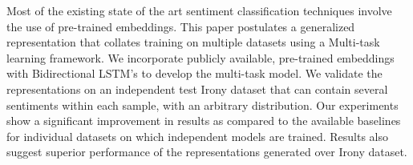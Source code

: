Most of the existing state of the art sentiment classification techniques involve the use of pre-trained embeddings. This paper postulates a generalized representation that collates training on multiple datasets using a Multi-task learning framework. We incorporate publicly available, pre-trained embeddings with Bidirectional LSTM's to develop the multi-task model. We validate the representations on an independent test Irony dataset that can contain several sentiments within each sample, with an arbitrary distribution. Our experiments show a significant improvement in results as compared to the available baselines for individual datasets on which independent models are trained. Results also suggest superior performance of the representations generated over Irony dataset.
